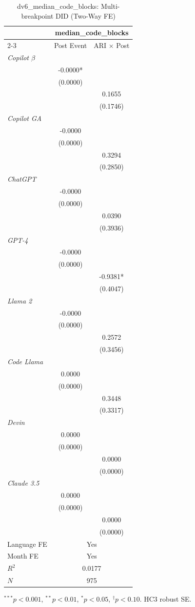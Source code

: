 \begin{table}[htbp]\centering
\caption{dv6_median_code_blocks: Multi-breakpoint DID (Two-Way FE)}
\begin{tabular}{lcc}
\toprule
 & \multicolumn{2}{c}{median_code_blocks} \\
\cmidrule(l){2-3}
 & Post Event & ARI $\times$ Post \\
\midrule
\textit{Copilot $\beta$} & & \\
 & -0.0000* & \\
 & (0.0000) & \\
 &  & 0.1655 \\
 &  & (0.1746) \\
\textit{Copilot GA} & & \\
 & -0.0000 & \\
 & (0.0000) & \\
 &  & 0.3294 \\
 &  & (0.2850) \\
\textit{ChatGPT} & & \\
 & -0.0000 & \\
 & (0.0000) & \\
 &  & 0.0390 \\
 &  & (0.3936) \\
\textit{GPT-4} & & \\
 & -0.0000 & \\
 & (0.0000) & \\
 &  & -0.9381* \\
 &  & (0.4047) \\
\textit{Llama 2} & & \\
 & -0.0000 & \\
 & (0.0000) & \\
 &  & 0.2572 \\
 &  & (0.3456) \\
\textit{Code Llama} & & \\
 & 0.0000 & \\
 & (0.0000) & \\
 &  & 0.3448 \\
 &  & (0.3317) \\
\textit{Devin} & & \\
 & 0.0000 & \\
 & (0.0000) & \\
 &  & 0.0000 \\
 &  & (0.0000) \\
\textit{Claude 3.5} & & \\
 & 0.0000 & \\
 & (0.0000) & \\
 &  & 0.0000 \\
 &  & (0.0000) \\
\midrule
Language FE & \multicolumn{2}{c}{Yes} \\
Month FE    & \multicolumn{2}{c}{Yes} \\
$R^2$ & \multicolumn{2}{c}{0.0177} \\
$N$   & \multicolumn{2}{c}{975} \\
\bottomrule
\end{tabular}
{\footnotesize $^{***}p<0.001$, $^{**}p<0.01$, $^{*}p<0.05$, $^{\dagger}p<0.10$. HC3 robust SE.}
\end{table}